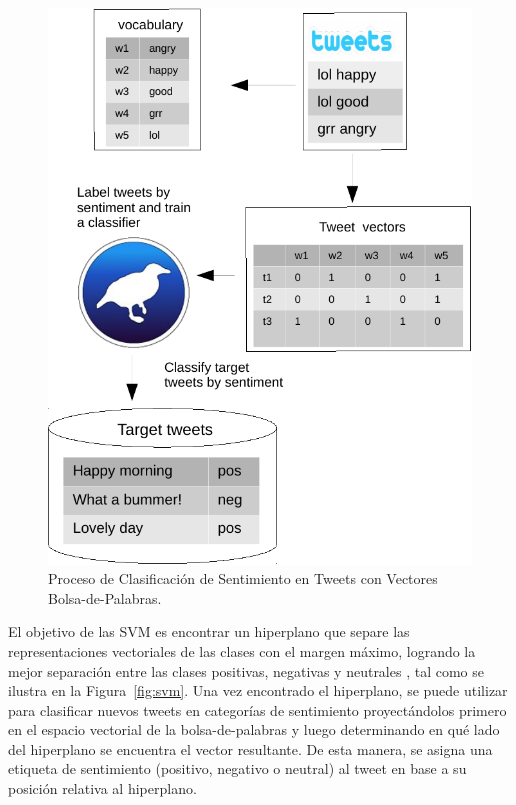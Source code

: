 \begin{figure}[h]
\centering
\includegraphics[scale = 0.5]{pics/bagOfwordsClassification.pdf}
\caption{Proceso de Clasificación de Sentimiento en Tweets con Vectores Bolsa-de-Palabras.}
\label{fig:senti_class}
\end{figure}

El objetivo de las SVM es encontrar un hiperplano que separe las representaciones vectoriales de las clases con el margen máximo, logrando la mejor separación entre las clases positivas, negativas y neutrales \cite{jacobbook}, tal como se ilustra en la Figura~\ref{fig:svm}. Una vez encontrado el hiperplano, se puede utilizar para clasificar nuevos tweets en categorías de sentimiento proyectándolos primero en el espacio vectorial de la bolsa-de-palabras y luego determinando en qué lado del hiperplano se encuentra el vector resultante. De esta manera, se asigna una etiqueta de sentimiento (positivo, negativo o neutral) al tweet en base a su posición relativa al hiperplano.

